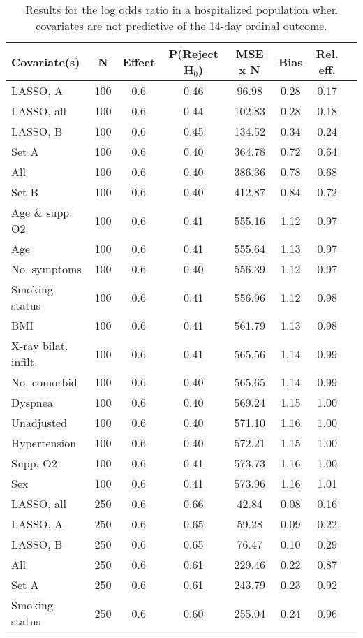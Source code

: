 \documentclass{article}
\begin{document}
{\tabcolsep=6pt  %
\begin{longtable}{lccccccc}
\caption{Results for the log odds ratio in a hospitalized population when covariates are not predictive of the 14-day ordinal outcome.}\label{tab21}\\
Covariate(s) & N & Effect & P(Reject H$_0$) & MSE x N & Bias & Rel. eff.\\ \midrule
LASSO, A & 100 & 0.6 & 0.46 & 96.98 & 0.28 & 0.17\\
LASSO, all & 100 & 0.6 & 0.44 & 102.83 & 0.28 & 0.18\\
LASSO, B & 100 & 0.6 & 0.45 & 134.52 & 0.34 & 0.24\\
Set A & 100 & 0.6 & 0.40 & 364.78 & 0.72 & 0.64\\
All & 100 & 0.6 & 0.40 & 386.36 & 0.78 & 0.68\\
Set B & 100 & 0.6 & 0.40 & 412.87 & 0.84 & 0.72\\
Age \& supp. O2 & 100 & 0.6 & 0.41 & 555.16 & 1.12 & 0.97\\
Age & 100 & 0.6 & 0.41 & 555.64 & 1.13 & 0.97\\
No. symptoms & 100 & 0.6 & 0.40 & 556.39 & 1.12 & 0.97\\
Smoking status & 100 & 0.6 & 0.41 & 556.96 & 1.12 & 0.98\\
BMI & 100 & 0.6 & 0.41 & 561.79 & 1.13 & 0.98\\
X-ray bilat. infilt. & 100 & 0.6 & 0.41 & 565.56 & 1.14 & 0.99\\
No. comorbid & 100 & 0.6 & 0.40 & 565.65 & 1.14 & 0.99\\
Dyspnea & 100 & 0.6 & 0.40 & 569.24 & 1.15 & 1.00\\
Unadjusted & 100 & 0.6 & 0.40 & 571.10 & 1.16 & 1.00\\
Hypertension & 100 & 0.6 & 0.40 & 572.21 & 1.15 & 1.00\\
Supp. O2 & 100 & 0.6 & 0.41 & 573.73 & 1.16 & 1.00\\
Sex & 100 & 0.6 & 0.41 & 573.96 & 1.16 & 1.01\\ \midrule
LASSO, all & 250 & 0.6 & 0.66 & 42.84 & 0.08 & 0.16\\
LASSO, A & 250 & 0.6 & 0.65 & 59.28 & 0.09 & 0.22\\
LASSO, B & 250 & 0.6 & 0.65 & 76.47 & 0.10 & 0.29\\
All & 250 & 0.6 & 0.61 & 229.46 & 0.22 & 0.87\\
Set A & 250 & 0.6 & 0.61 & 243.79 & 0.23 & 0.92\\
Smoking status & 250 & 0.6 & 0.60 & 255.04 & 0.24 & 0.96\\

\end{longtable}}
\end{document}
